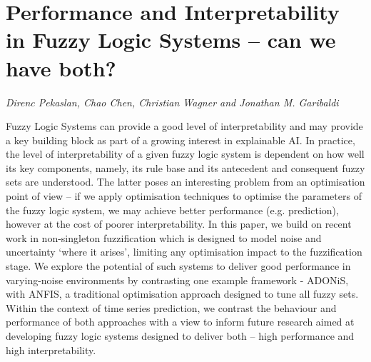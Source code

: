 \documentclass[../booklet.tex]{subfiles}
\begin{document}
\section[Performance and Interpretability in Fuzzy Logic Systems – can we have both?. {\it Direnc Pekaslan, Chao Chen, Christian Wagner and Jonathan M. Garibaldi}]{Performance and Interpretability in Fuzzy Logic Systems – can we have both?}
   

\begin{center}
  {\it Direnc Pekaslan, Chao Chen, Christian Wagner and Jonathan M. Garibaldi}
\end{center}

\vskip 0.8cm



Fuzzy Logic Systems can provide a good level of interpretability and may provide a key building block as part of a growing interest in explainable AI. In practice, the level of interpretability of a given fuzzy logic system is dependent on how well its key components, namely, its rule base and its antecedent and consequent fuzzy sets are understood. The latter poses an interesting problem from an optimisation point of view -- if we apply optimisation techniques to optimise the parameters of the fuzzy logic system, we may achieve better performance (e.g. prediction), however at the cost of poorer interpretability. In this paper, we build on recent work in non-singleton fuzzification which is designed to model noise and uncertainty `where it arises', limiting any optimisation impact to the fuzzification stage. We explore the potential of such systems to deliver good performance in varying-noise environments by contrasting one example framework - ADONiS, with ANFIS, a traditional optimisation approach designed to tune all fuzzy sets. Within the context of time series prediction, we contrast the behaviour and performance of both approaches with a view to inform future research aimed at developing fuzzy logic systems designed to deliver both -- high performance and high interpretability. 

\end{document}
